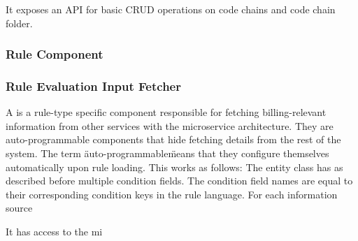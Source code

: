 It exposes an API for basic CRUD operations on code chains and code chain folder.



\subsubsection{Rule Component}

\subsubsection{Rule Evaluation Input Fetcher}
A  is a rule-type specific component responsible for fetching billing-relevant information from other services with the \AV microservice architecture.
They are auto-programmable components that hide fetching details from the rest of the system.
The term \"auto-programmable\" means that they configure themselves automatically upon rule loading.
This works as follows: The  entity class has as described before multiple condition fields.
The condition field names are equal to their corresponding condition keys in the rule language.
For each information source 



It has access to the mi



